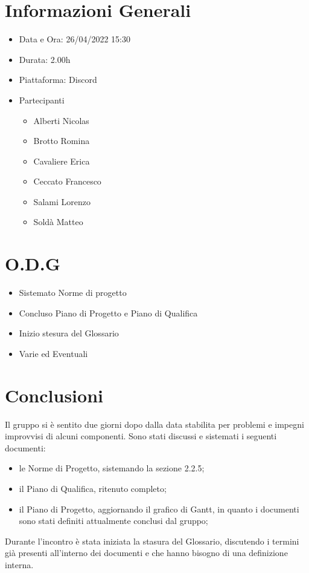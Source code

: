 \documentclass[a4paper, 12pt]{article}
\begin{document}
\makefrontpage

\section*{Informazioni Generali}
\begin{itemize}
    \item Data e Ora: 26/04/2022 15:30
    \item Durata: 2.00h
    \item Piattaforma: Discord
    \item Partecipanti
    \begin{itemize}
        \item Alberti Nicolas
        \item Brotto Romina
        \item Cavaliere Erica
        \item Ceccato Francesco
        \item Salami Lorenzo
        \item Soldà Matteo
    \end{itemize}
\end{itemize}

\section*{O.D.G}
\begin{itemize}
    \item Sistemato Norme di progetto
    \item Concluso Piano di Progetto e Piano di Qualifica
    \item Inizio stesura del Glossario
    \item Varie ed Eventuali
\end{itemize}

\section*{Conclusioni}
Il gruppo si è sentito due giorni dopo dalla data stabilita per problemi e impegni improvvisi di alcuni componenti.\newline
Sono stati discussi e sistemati i seguenti documenti:
\begin{itemize}
    \item le Norme di Progetto, sistemando la sezione 2.2.5;
    \item il Piano di Qualifica, ritenuto completo;
    \item il Piano di Progetto, aggiornando il grafico di Gantt, in quanto i documenti sono stati definiti attualmente conclusi dal gruppo;
\end{itemize}
Durante l'incontro è stata iniziata la stasura del Glossario, discutendo i termini già presenti all'interno dei documenti e che hanno bisogno di una definizione interna.
\end{document}

